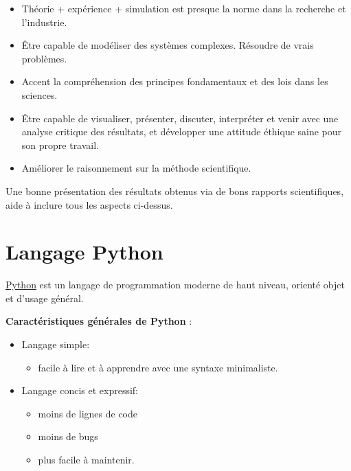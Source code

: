 \documentclass[%
oneside,                 %
final,                   %
10pt]{article}
\begin{document}
\begin{itemize}
\item Théorie + expérience + simulation est presque la norme dans la recherche et l'industrie.

\item Être capable de modéliser des systèmes complexes. Résoudre de vrais problèmes.

\item Accent la compréhension des principes fondamentaux et des lois dans les sciences.

\item Être capable de visualiser, présenter, discuter, interpréter et venir avec une analyse critique des résultats, et développer une attitude éthique saine pour son propre travail.

\item Améliorer le raisonnement sur la méthode scientifique.
\end{itemize}

\noindent
Une bonne présentation des résultats obtenus via de bons rapports scientifiques, aide à inclure tous les aspects ci-dessus.

\section{Langage Python}

\href{{http://www.python.org/}}{Python} est un langage de programmation moderne de haut niveau, orienté objet et d'usage général.

\textbf{Caractéristiques générales de Python} :

\begin{itemize}
\item Langage simple:
\begin{itemize}

  \item facile à lire et à apprendre avec une syntaxe minimaliste.

\end{itemize}

\noindent
\item Langage concis et expressif:
\begin{itemize}

  \item moins de lignes de code

  \item moins de bugs

  \item plus facile à maintenir.
\end{itemize}

\noindent
\end{itemize}
\end{document}

